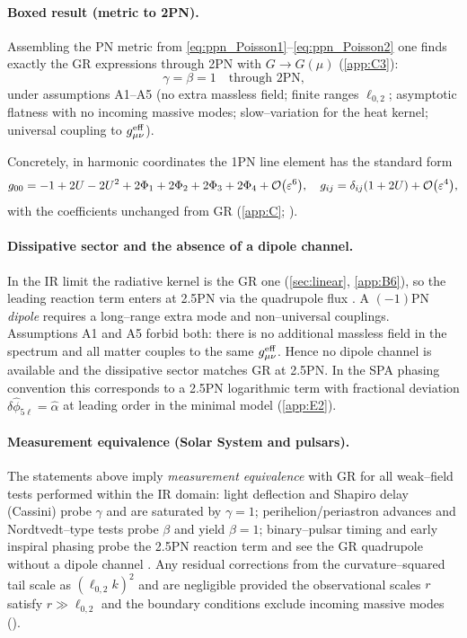 \documentclass{iopjournal}
\begin{document}
\paragraph{Boxed result (metric to 2PN).}
Assembling the PN metric from \eqref{eq:ppn_Poisson1}–\eqref{eq:ppn_Poisson2} one finds exactly the GR expressions through 2PN with $G\to G(\mu)$ (\cref{app:C3}):
\[
\boxed{\gamma=\beta=1\quad\text{through 2PN,}}
\]
under assumptions A1–A5 (no extra massless field; finite ranges $\ell_{0,2}$; asymptotic flatness with no incoming massive modes; slow–variation for the heat kernel; universal coupling to $g^{\rm eff}_{\mu\nu}$).

Concretely, in harmonic coordinates the 1PN line element has the standard form
\[
g_{00}=-1+2U-2U^2+2\Phi_1+2\Phi_2+2\Phi_3+2\Phi_4+\order{\varepsilon^{6}},\quad
g_{ij}=\delta_{ij}(1+2U)+\order{\varepsilon^{4}},
\]
with the coefficients unchanged from GR (\cref{app:C}; \cite{PoissonWill2014,Blanchet2014LRR}).

\paragraph{Dissipative sector and the absence of a dipole channel.}
In the IR limit the radiative kernel is the GR one (\cref{sec:linear}, \cref{app:B6}), so the leading reaction term enters at 2.5PN via the quadrupole flux \cite{Blanchet2014LRR}. A $(-1)$PN \emph{dipole} requires a long–range extra mode and non–universal couplings. Assumptions A1 and A5 forbid both: there is no additional massless field in the spectrum and all matter couples to the same $g^{\rm eff}_{\mu\nu}$. Hence no dipole channel is available and the dissipative sector matches GR at 2.5PN. In the SPA phasing convention this corresponds to a 2.5PN logarithmic term with fractional deviation $\delta\hat\phi_{5\ell}=\widehat\alpha$ at leading order in the minimal model (\cref{app:E2}).

\paragraph{Measurement equivalence (Solar System and pulsars).}
The statements above imply \emph{measurement equivalence} with GR for all weak–field tests performed within the IR domain: light deflection and Shapiro delay (Cassini) probe $\gamma$ and are saturated by $\gamma=1$; perihelion/periastron advances and Nordtvedt–type tests probe $\beta$ and yield $\beta=1$; binary–pulsar timing and early inspiral phasing probe the 2.5PN reaction term and see the GR quadrupole without a dipole channel \cite{Will2014LRR,PoissonWill2014,Blanchet2014LRR,BertottiIessTortora2003}. Any residual corrections from the curvature–squared tail scale as $(\ell_{0,2}k)^2$ and are negligible provided the observational scales $r$ satisfy $r\gg \ell_{0,2}$ and the boundary conditions exclude incoming massive modes ().
\end{document}
